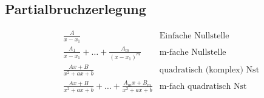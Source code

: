 \subsection{Partialbruchzerlegung}
\begin{tcolorbox}[colback=white!10!white,colframe=blue!50!black,title=Regeln]
    \begin{align*}
        &\frac{A}{x-x_1}&\text{Einfache Nullstelle}\\
        &\frac{A_1}{x-x_1}+ \ldots + \frac{A_m}{(x-x_1)^m }&\text{m-fache Nullstelle}\\
        &\frac{Ax+B}{x^2+ax+b} &\text{quadratisch (komplex) Nst}\\
        &\frac{Ax+B}{x^2+ax+b}+ \ldots + \frac{A_mx+B_m}{x^2+ax+b} &\text{m-fach quadratisch Nst}\\
    \end{align*}
\end{tcolorbox}

